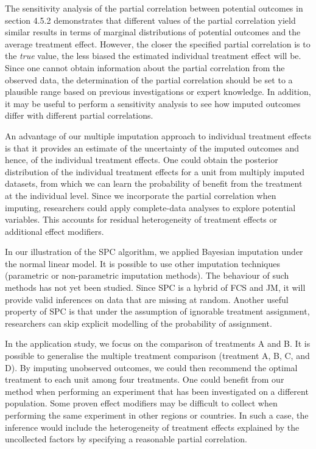 	The sensitivity analysis of the partial correlation between potential outcomes in section 4.5.2 demonstrates that different values of the partial correlation yield similar results in terms of marginal distributions of potential outcomes and the average treatment effect. However, the closer the specified partial correlation is to the \emph{true} value, the less biased the estimated individual treatment effect will be. Since one cannot obtain information about the partial correlation from the observed data, the determination of the partial correlation should be set to a plausible range based on previous investigations or expert knowledge. In addition, it may be useful to perform a sensitivity analysis to see how imputed outcomes differ with different partial correlations. 
	
	An advantage of our multiple imputation approach to individual treatment effects is that it provides an estimate of the uncertainty of the imputed outcomes and hence, of the individual treatment effects. One could obtain the posterior distribution of the individual treatment effects for a unit from multiply imputed datasets, from which we can learn the probability of benefit from the treatment at the individual level. Since we incorporate the partial correlation when imputing, researchers could apply complete-data analyses to explore potential variables. This accounts for residual heterogeneity of treatment effects or additional effect modifiers. 
	
	In our illustration of the SPC algorithm, we applied Bayesian imputation under the normal linear model. It is possible to use other imputation techniques (parametric or non-parametric imputation methods). The behaviour of such methods has not yet been studied. Since SPC is a hybrid of FCS and JM, it will provide valid inferences on data that are missing at random.  Another useful property of SPC is that under the assumption of ignorable treatment assignment, researchers can skip explicit modelling of the probability of assignment. 
	
	In the application study, we focus on the comparison of treatments A and B. It is possible to generalise the multiple treatment comparison (treatment A, B, C, and D). By imputing unobserved outcomes, we could then recommend the optimal treatment to each unit among four treatments. One could benefit from our method when performing an experiment that has been investigated on a different population. Some proven effect modifiers may be difficult to collect when performing the same experiment in other regions or countries. In such a case, the inference would include the heterogeneity of treatment effects explained by the uncollected factors by specifying a reasonable partial correlation.         
	
